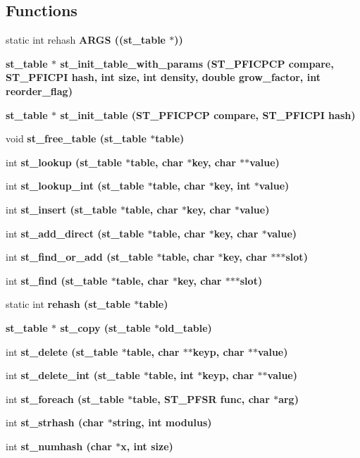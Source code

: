 \subsection*{Functions}
\begin{CompactItemize}
\item 
static int rehash \bf{ARGS} ((\bf{st\_\-table} $\ast$))
\item 
\bf{st\_\-table} $\ast$ \bf{st\_\-init\_\-table\_\-with\_\-params} (\bf{ST\_\-PFICPCP} compare, \bf{ST\_\-PFICPI} hash, int \bf{size}, int density, double grow\_\-factor, int reorder\_\-flag)
\item 
\bf{st\_\-table} $\ast$ \bf{st\_\-init\_\-table} (\bf{ST\_\-PFICPCP} compare, \bf{ST\_\-PFICPI} hash)
\item 
void \bf{st\_\-free\_\-table} (\bf{st\_\-table} $\ast$table)
\item 
int \bf{st\_\-lookup} (\bf{st\_\-table} $\ast$table, char $\ast$key, char $\ast$$\ast$value)
\item 
int \bf{st\_\-lookup\_\-int} (\bf{st\_\-table} $\ast$table, char $\ast$key, int $\ast$value)
\item 
int \bf{st\_\-insert} (\bf{st\_\-table} $\ast$table, char $\ast$key, char $\ast$value)
\item 
int \bf{st\_\-add\_\-direct} (\bf{st\_\-table} $\ast$table, char $\ast$key, char $\ast$value)
\item 
int \bf{st\_\-find\_\-or\_\-add} (\bf{st\_\-table} $\ast$table, char $\ast$key, char $\ast$$\ast$$\ast$slot)
\item 
int \bf{st\_\-find} (\bf{st\_\-table} $\ast$table, char $\ast$key, char $\ast$$\ast$$\ast$slot)
\item 
static int \bf{rehash} (\bf{st\_\-table} $\ast$table)
\item 
\bf{st\_\-table} $\ast$ \bf{st\_\-copy} (\bf{st\_\-table} $\ast$old\_\-table)
\item 
int \bf{st\_\-delete} (\bf{st\_\-table} $\ast$table, char $\ast$$\ast$keyp, char $\ast$$\ast$value)
\item 
int \bf{st\_\-delete\_\-int} (\bf{st\_\-table} $\ast$table, int $\ast$keyp, char $\ast$$\ast$value)
\item 
int \bf{st\_\-foreach} (\bf{st\_\-table} $\ast$table, \bf{ST\_\-PFSR} func, char $\ast$arg)
\item 
int \bf{st\_\-strhash} (char $\ast$string, int modulus)
\item 
int \bf{st\_\-numhash} (char $\ast$x, int \bf{size})
\item 

\end{CompactItemize}

